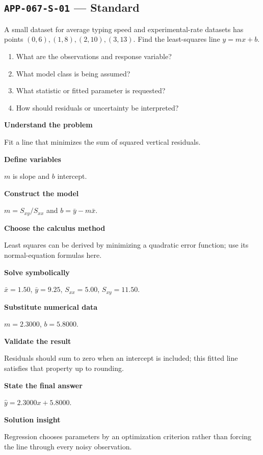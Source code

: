 \documentclass[11pt]{book}
\newcommand{\pid}[1]{\texttt{#1}}
\begin{document}
\subsection*{\pid{APP-067-S-01} — Standard}
\begin{problembox}
A small dataset for average typing speed and experimental-rate datasets has points $(0,6),(1,8),(2,10),(3,13)$. Find the least-squares line $y=mx+b$.
\end{problembox}
\begin{promptbox}\begin{enumerate}
\item What are the observations and response variable?
\item What model class is being assumed?
\item What statistic or fitted parameter is requested?
\item How should residuals or uncertainty be interpreted?
\end{enumerate}\end{promptbox}
\begin{solutionbox}
\textbf{Understand the problem}\par Fit a line that minimizes the sum of squared vertical residuals.\par\medskip
\textbf{Define variables}\par $m$ is slope and $b$ intercept.\par\medskip
\textbf{Construct the model}\par $m=S_{xy}/S_{xx}$ and $b=\bar y-m\bar x$.\par\medskip
\textbf{Choose the calculus method}\par Least squares can be derived by minimizing a quadratic error function; use its normal-equation formulas here.\par\medskip
\textbf{Solve symbolically}\par $\bar x=1.50$, $\bar y=9.25$, $S_{xx}=5.00$, $S_{xy}=11.50$.\par\medskip
\textbf{Substitute numerical data}\par $m=2.3000$, $b=5.8000$.\par\medskip
\textbf{Validate the result}\par Residuals should sum to zero when an intercept is included; this fitted line satisfies that property up to rounding.\par\medskip
\textbf{State the final answer}\par $\hat y=2.3000x+5.8000$.\par\medskip
\textbf{Solution insight}\par Regression chooses parameters by an optimization criterion rather than forcing the line through every noisy observation.\par\medskip
\end{solutionbox}
\end{document}
